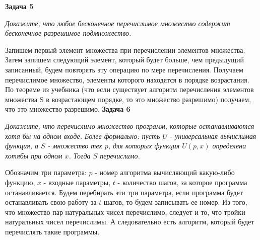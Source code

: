 \documentclass{article}
\begin{document}
\newline \newline
 \noindent \textbf{Задача 5}
\begin{center}
\textit{Докажите, что любое бесконечное перечислимое множество содержит бесконечное разрешимое подмножество.} 
\end{center}
Запишем первый элемент множества при перечислении элементов множества. Затем запишем следующий элемент, который будет больше, чем предыдущий записанный, будем повторять эту операцию по мере перечисления. Получаем перечислимое множество, элементы которого находятся в порядке возрастания. По теореме из учебника (что если существует алгоритм перечисления элементов множества S в возрастающем порядке, то это множество разрешимо) получаем, что это множество разрешимо.
\newline \newline
 \noindent \textbf{Задача 6}
\begin{center}
\textit{Докажите, что перечислимо множество программ, которые останавливаются хотя бы на одном входе. Более формально: пусть $U$ - универсальная вычислимая функция, а $S$ - множество тех $p$, для которых функция $U(p,x)$ определена хотябы при одном $x$. Тогда $S$ перечислимо.}
\end{center}
Обозначим три параметра: $p$ - номер алгоритма вычисляющий какую-либо функцию, $x$ - входные параметры, $t$ - количество шагов, за которое программа останавливается. Будем перебирать эти три параметра, если программа будет останавливать свою работу за $t$ шагов, то будем записывать ее номер. Из того, что множество пар натуральных чисел перечислимо, следует и то, что тройки натуральных чисел перечислимы. А следовательно есть алгоритм, который будет перечислять такие программы.
\newline
 \newline
\end{document}
